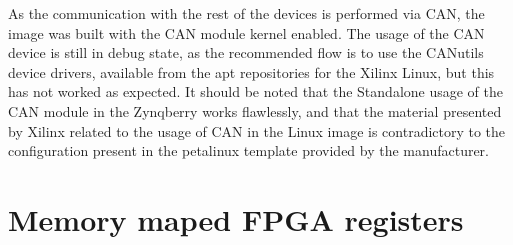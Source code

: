 As the communication with the rest of the devices is performed via CAN, the image was built with the
CAN module kernel enabled. The usage of the CAN device is still in debug state, as the recommended
flow is to use the CANutils device drivers, available from the apt repositories for the Xilinx
Linux, but this has not worked as expected. It should be noted that the Standalone usage of the CAN
module in the Zynqberry works flawlessly, and that the material presented by Xilinx related to
the usage of CAN in the Linux image is contradictory to the configuration present in the petalinux
template provided by the manufacturer.

\section{Memory maped FPGA registers}


